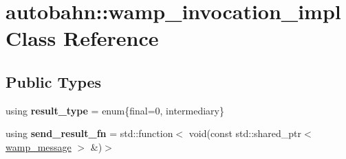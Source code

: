 \hypertarget{classautobahn_1_1wamp__invocation__impl}{}\section{autobahn\+:\+:wamp\+\_\+invocation\+\_\+impl Class Reference}
\label{classautobahn_1_1wamp__invocation__impl}
\subsection*{Public Types}
\begin{DoxyCompactItemize}
\item 
using {\bfseries result\+\_\+type} = enum\{final=0, intermediary\}\hypertarget{classautobahn_1_1wamp__invocation__impl_abb8eba64537d6f8e1a6b7b54f1191692}{}\label{classautobahn_1_1wamp__invocation__impl_abb8eba64537d6f8e1a6b7b54f1191692}

\item 
using {\bfseries send\+\_\+result\+\_\+fn} = std\+::function$<$ void(const std\+::shared\+\_\+ptr$<$ \hyperlink{classautobahn_1_1wamp__message}{wamp\+\_\+message} $>$ \&)$>$\hypertarget{classautobahn_1_1wamp__invocation__impl_a596775ea5662121f01daa4930cf48cca}{}\label{classautobahn_1_1wamp__invocation__impl_a596775ea5662121f01daa4930cf48cca}

\end{DoxyCompactItemize}
